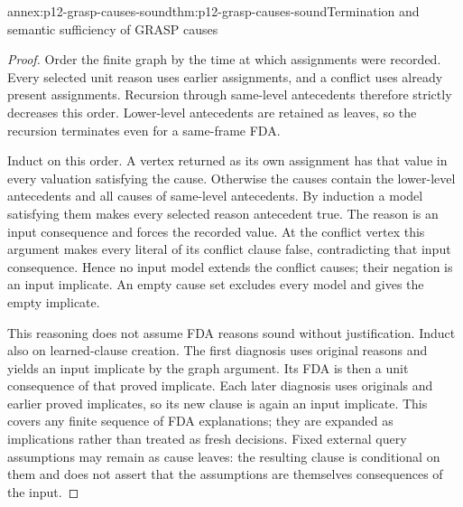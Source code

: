 \begin{annexitem}{annex:p12-grasp-causes-sound}{thm:p12-grasp-causes-sound}{Termination and semantic sufficiency of GRASP causes}
\begin{proof}
Order the finite graph by the time at which assignments were recorded.
Every selected unit reason uses earlier assignments, and a conflict uses
already present assignments.  Recursion through same-level antecedents
therefore strictly decreases this order.  Lower-level antecedents are
retained as leaves, so the recursion terminates even for a same-frame FDA.

Induct on this order.  A vertex returned as its own assignment has that
value in every valuation satisfying the cause.  Otherwise the causes contain
the lower-level antecedents and all causes of same-level antecedents.
By induction a model satisfying them makes every selected reason antecedent
true.  The reason is an input consequence and forces the recorded value.
At the conflict vertex this argument makes every literal of its conflict
clause false, contradicting that input consequence.  Hence no input model
extends the conflict causes; their negation is an input implicate.  An empty
cause set excludes every model and gives the empty implicate.

This reasoning does not assume FDA reasons sound without justification.
Induct also on learned-clause creation.  The first diagnosis uses original
reasons and yields an input implicate by the graph argument.  Its FDA is
then a unit consequence of that proved implicate.  Each later diagnosis
uses originals and earlier proved implicates, so its new clause is again
an input implicate.  This covers any finite sequence of FDA explanations;
they are expanded as implications rather than treated as fresh decisions.
Fixed external query assumptions may remain as cause leaves: the resulting
clause is conditional on them and does not assert that the assumptions are
themselves consequences of the input.
\end{proof}
\end{annexitem}

